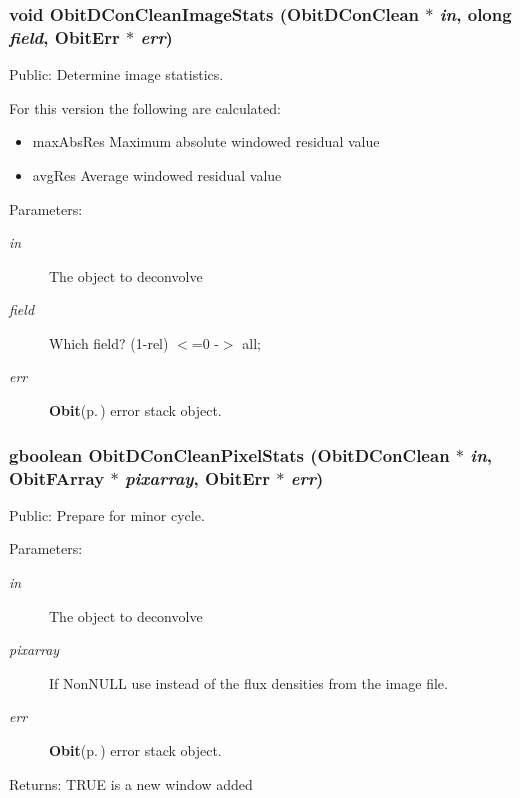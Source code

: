 \subsubsection{\setlength{\rightskip}{0pt plus 5cm}void Obit\-DCon\-Clean\-Image\-Stats ({\bf Obit\-DCon\-Clean} $\ast$ {\em in}, {\bf olong} {\em field}, {\bf Obit\-Err} $\ast$ {\em err})}\label{ObitDConClean_8h_a22}


Public: Determine image statistics. 

For this version the following are calculated: \begin{itemize}
\item max\-Abs\-Res Maximum absolute windowed residual value \item avg\-Res Average windowed residual value\end{itemize}
\begin{Desc}
\item[Parameters:]
\begin{description}
\item[{\em in}]The object to deconvolve \item[{\em field}]Which field? (1-rel) $<$=0 -$>$ all; \item[{\em err}]{\bf Obit}{\rm (p.\,\pageref{structObit})} error stack object. \end{description}
\end{Desc}
\subsubsection{\setlength{\rightskip}{0pt plus 5cm}gboolean Obit\-DCon\-Clean\-Pixel\-Stats ({\bf Obit\-DCon\-Clean} $\ast$ {\em in}, {\bf Obit\-FArray} $\ast$ {\em pixarray}, {\bf Obit\-Err} $\ast$ {\em err})}\label{ObitDConClean_8h_a21}


Public: Prepare for minor cycle. 

\begin{Desc}
\item[Parameters:]
\begin{description}
\item[{\em in}]The object to deconvolve \item[{\em pixarray}]If Non\-NULL use instead of the flux densities from the image file. \item[{\em err}]{\bf Obit}{\rm (p.\,\pageref{structObit})} error stack object. \end{description}
\end{Desc}
\begin{Desc}
\item[Returns:]TRUE is a new window added \end{Desc}
